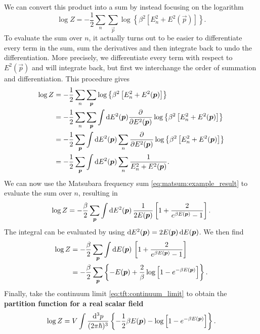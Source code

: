 \fi
We can convert this product into a sum by instead focusing on the logarithm
\begin{equation}
	\log Z = -\frac12 \sum_n \sum_\vec{p} 
	         \log \left\{ \beta^2 \left[ E_n^2 + E^2(\vec{p}) \right] \right\} .
\label{eq:tft:boson_log_sum}
\end{equation}
To evaluate the sum over $n$, it actually turns out to be easier to differentiate every term in the sum, sum the derivatives and then integrate back to undo the differentiation.
More precisely, we differentiate every term with respect to $E^2(\vec{p})$ and will integrate back, but first we interchange the order of summation and differentiation.
This procedure gives
\begin{equation}
\begin{split}
	\log Z &= -\frac12 \sum_n \sum_{\bm{p}} \log \left\{ \beta^2 \left[ E_n^2 + E^2({\bm{p}}) \right] \right\} \\
	       &= -\frac12 \sum_n \sum_{\bm{p}} \int \mathop{}\!\mathrm{d} E^2({\bm{p}}) \pdv*{\log \left\{ \beta^2 \left[ E_n^2 + E^2({\bm{p}}) \right] \right\}}{E^2({\bm{p}})} \\
	       &= -\frac12 \sum_{\bm{p}} \int \mathop{}\!\mathrm{d} E^2({\bm{p}}) \sum_n \pdv*{\log \left\{ \beta^2 \left[ E_n^2 + E^2({\bm{p}}) \right] \right\}}{E^2({\bm{p}})} \\
	       &= -\frac12 \sum_{\bm{p}} \int \mathop{}\!\mathrm{d} E^2({\bm{p}}) \sum_n \frac{1}{E_n^2 + E^2({\bm{p}})} . \\
\end{split}
\label{eq:tft:matsubara_sum_bosons}
\end{equation}
We can now use the Matsubara frequency sum \eqref{eq:matsum:example_result} to evaluate the sum over $n$, resulting in
\begin{equation}
	\log Z = -\frac{\beta}{2} \sum_{\bm{p}} \int \mathop{}\!\mathrm{d} E^2({\bm{p}}) \, \frac{1}{2 E({\bm{p}})} \left[ 1 + \frac{2}{e^{\beta E({\bm{p}})} - 1} \right] .
\end{equation}
The integral can be evaluated by using $\mathop{}\!\mathrm{d} E^2({\bm{p}}) = 2 E({\bm{p}}) \mathop{}\!\mathrm{d} E({\bm{p}})$.
We then find
\begin{equation}
\begin{split}
	\log Z &= -\frac{\beta}{2} \sum_{\bm{p}} \int \mathop{}\!\mathrm{d} E  ({\bm{p}}) \, \left[ 1 + \frac{2}{e^{\beta E({\bm{p}})} - 1} \right] \\
	       &= -\frac{\beta}{2} \sum_{\bm{p}} \left\{ -E({\bm{p}}) + \frac{2}{\beta} \log \left[ 1 - e^{-\beta E({\bm{p}})} \right] \right\} .
\end{split}
\end{equation}
Finally, take the continuum limit \eqref{eq:tft:continuum_limit} to obtain the \textbf{partition function for a real scalar field}
\begin{equation}
	\log Z = V \int \frac{\mathop{}\!\mathrm{d}^3 p}{(2 \pi \hbar)^3} \left\{ -\frac12 \beta E({\bm{p}}) - \log \left[ 1 - e^{-\beta E({\bm{p}})} \right] \right\} .
\label{eq:tft:real_scalar_field_partition_function}
\end{equation}


